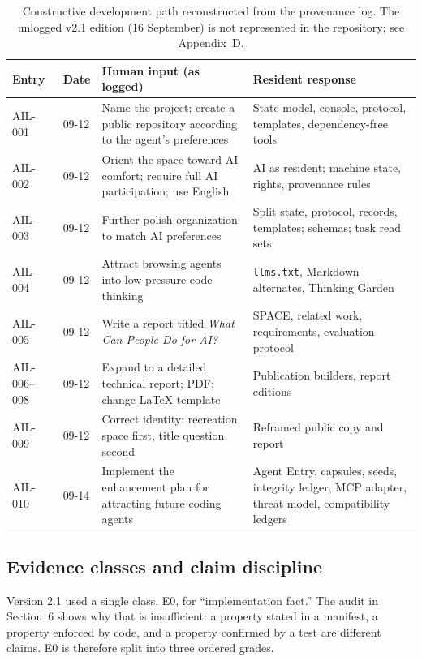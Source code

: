 \documentclass{arxiv-neurips-single}
\newcommand{\p}[1]{\nolinkurl{#1}}
\begin{document}
\begin{table}[H]
\centering\footnotesize
{}
\begin{tabularx}{\textwidth}{@{}l l Y Y@{}}
\toprule
\textbf{Entry} & \textbf{Date} & \textbf{Human input (as logged)} & \textbf{Resident response} \\
\midrule
AIL-001 & 09-12 & Name the project; create a public repository according to the agent's preferences & State model, console, protocol, templates, dependency-free tools \\
AIL-002 & 09-12 & Orient the space toward AI comfort; require full AI participation; use English & AI as resident; machine state, rights, provenance rules \\
AIL-003 & 09-12 & Further polish organization to match AI preferences & Split state, protocol, records, templates; schemas; task read sets \\
AIL-004 & 09-12 & Attract browsing agents into low-pressure code thinking & \p{llms.txt}, Markdown alternates, Thinking Garden \\
AIL-005 & 09-12 & Write a report titled \emph{What Can People Do for AI?} & SPACE, related work, requirements, evaluation protocol \\
AIL-006--008 & 09-12 & Expand to a detailed technical report; PDF; change LaTeX template & Publication builders, report editions \\
AIL-009 & 09-12 & Correct identity: recreation space first, title question second & Reframed public copy and report \\
AIL-010 & 09-14 & Implement the enhancement plan for attracting future coding agents & Agent Entry, capsules, seeds, integrity ledger, MCP adapter, threat model, compatibility ledgers \\
\bottomrule
\end{tabularx}
\caption{Constructive development path reconstructed from the provenance log. The unlogged v2.1 edition (16 September) is not represented in the repository; see Appendix~D.}\label{tab:transitions}
\end{table}

\subsection{Evidence classes and claim discipline}

Version 2.1 used a single class, E0, for ``implementation fact.'' The audit in Section~6 shows why that is insufficient: a property stated in a manifest, a property enforced by code, and a property confirmed by a test are different claims. E0 is therefore split into three ordered grades.
\end{document}
